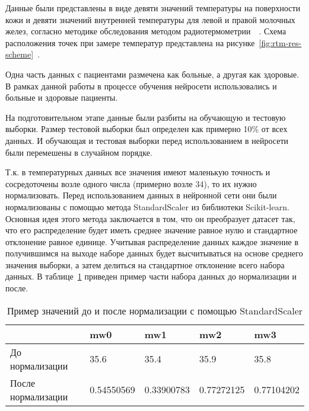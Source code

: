 Данные были представлены в виде девяти значений температуры на поверхности кожи и девяти значений внутренней температуры для левой и правой молочных желез, согласно методике обследования методом радиотермометрии~\cite{bardati}~\cite{fear2000}. Схема расположения точек при замере температур представлена на рисунке~\ref{fig:rtm-res-scheme}~\cite{vesninSovMicrowave}.




Одна часть данных с пациентами размечена как больные, а другая как здоровые. В рамках данной работы в процессе обучения нейросети использовались и больные и здоровые пациенты.


На подготовительном этапе данные были разбиты на обучающую и тестовую выборки. Размер тестовой выборки был определен как примерно 10\% от всех данных. И обучающая и тестовая выборки перед использованием в нейросети были перемешены в случайном порядке.


Т.к. в температурных данных все значения имеют маленькую точность и сосредоточены возле одного числа (примерно возле 34), то их нужно нормализовать. Перед использованием данных в нейронной сети они были нормализованы с помощью метода StandardScaler из библиотеки Scikit-learn. Основная идея этого метода заключается в том, что он преобразует датасет так, что его распределение будет иметь среднее значение равное нулю и стандартное отклонение равное единице. Учитывая распределение данных каждое значение в получившимся на выходе наборе данных будет высчитываться на основе среднего значения выборки, а затем делиться на стандартное отклонение всего набора данных. В таблице~\ref{tab:1} приведен пример части набора данных до нормализации и после.


\begin{table}[h]
	\caption{Пример значений до и после нормализации с помощью StandardScaler}
	\label{tab:1}
	\begin{center}
	\begin{tabular}{|l|l|l|l|l|}
	\hline
	& mw0      & mw1      & mw2      & mw3 \\
	\hline
	До нормализации         & 35.6       & 35.4       & 35.9       & 35.8\\
	\hline
	После нормализации & 0.54550569 & 0.33900783 & 0.77272125 & 0.77104202\\
	\hline
	\end{tabular}
	\end{center}
\end{table}


